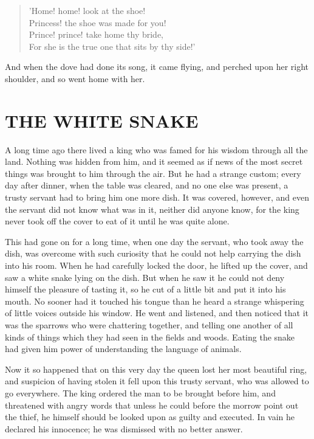 \documentclass[12pt]{book}
\begin{document}
\begin{verse}
 'Home! home! look at the shoe!\\
  Princess! the shoe was made for you!\\
  Prince! prince! take home thy bride,\\
  For she is the true one that sits by thy side!'
\end{verse}

And when the dove had done its song, it came flying, and perched upon
her right shoulder, and so went home with her.



\chapter{THE WHITE SNAKE}

A long time ago there lived a king who was famed for his wisdom
through all the land. Nothing was hidden from him, and it seemed as if
news of the most secret things was brought to him through the air. But
he had a strange custom; every day after dinner, when the table was
cleared, and no one else was present, a trusty servant had to bring
him one more dish. It was covered, however, and even the servant did
not know what was in it, neither did anyone know, for the king never
took off the cover to eat of it until he was quite alone.

This had gone on for a long time, when one day the servant, who took
away the dish, was overcome with such curiosity that he could not help
carrying the dish into his room. When he had carefully locked the
door, he lifted up the cover, and saw a white snake lying on the dish.
But when he saw it he could not deny himself the pleasure of tasting
it, so he cut of a little bit and put it into his mouth. No sooner had
it touched his tongue than he heard a strange whispering of little
voices outside his window. He went and listened, and then noticed that
it was the sparrows who were chattering together, and telling one
another of all kinds of things which they had seen in the fields and
woods. Eating the snake had given him power of understanding the
language of animals.

Now it so happened that on this very day the queen lost her most
beautiful ring, and suspicion of having stolen it fell upon this
trusty servant, who was allowed to go everywhere. The king ordered the
man to be brought before him, and threatened with angry words that
unless he could before the morrow point out the thief, he himself
should be looked upon as guilty and executed. In vain he declared his
innocence; he was dismissed with no better answer.
\end{document}
